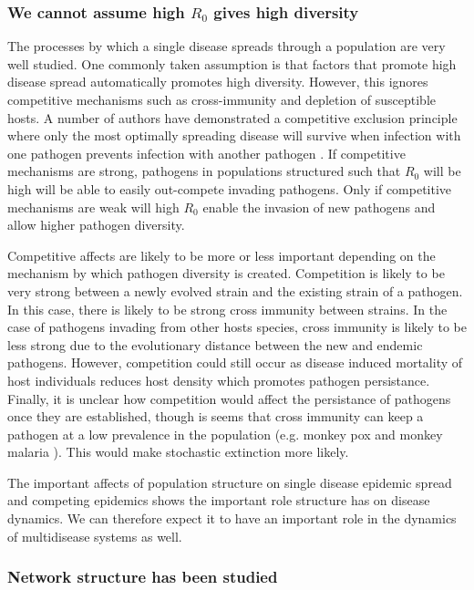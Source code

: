 \subsubsection{We cannot assume high $R_0$ gives high diversity}
The processes by which a single disease spreads through a population are very well studied.
One commonly taken assumption is that factors that promote high disease spread automatically promotes high diversity.
However, this ignores competitive mechanisms such as cross-immunity and depletion of susceptible hosts.
A number of authors have demonstrated a competitive exclusion principle where only the most optimally spreading disease will survive when infection with one pathogen prevents infection with another pathogen \cite{bremermann1989competitive, martcheva2013competitive, ackleh2003competitive, ackleh2014robust, turner2002impact}.
If competitive mechanisms are strong, pathogens in populations structured such that $R_0$ will be high will be able to easily out-compete invading pathogens.
Only if competitive mechanisms are weak will high $R_0$  enable the invasion of new pathogens and allow higher pathogen diversity.

Competitive affects are likely to be more or less important depending on the mechanism by which pathogen diversity is created.
Competition is likely to be very strong between a newly evolved strain and the existing strain of a pathogen. 
In this case, there is likely to be strong cross immunity between strains.
In the case of pathogens invading from other hosts species, cross immunity is likely to be less strong due to the evolutionary distance between the new and endemic pathogens.
However, competition could still occur as disease induced mortality of host individuals reduces host density which promotes pathogen persistance.
Finally, it is unclear how competition would affect the persistance of pathogens once they are established, though is seems that cross immunity can keep a pathogen at a low prevalence in the population (e.g. monkey pox \cite{rimoin2010major} and monkey malaria \cite{cox2008knowlesi}). 
This would make stochastic extinction more likely.

The important affects of population structure on single disease epidemic spread and competing epidemics shows the important role structure has on disease dynamics.
We can therefore expect it to have an important role in the dynamics of multidisease systems as well.

\subsubsection{Network structure has been studied}
 
